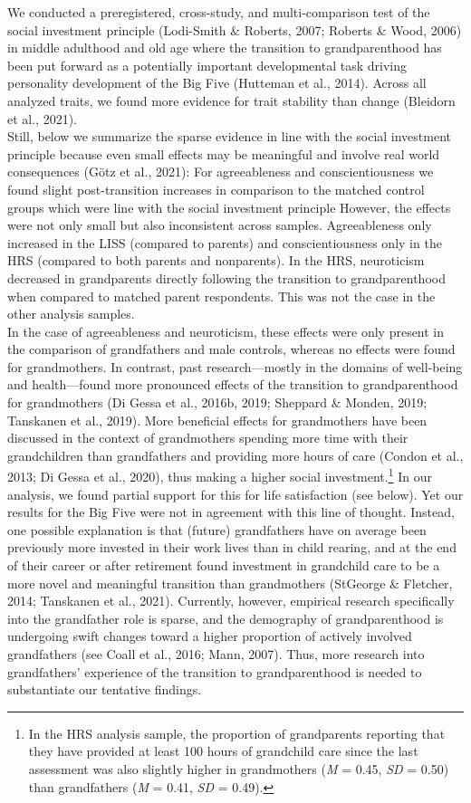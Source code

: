 \documentclass[
  english,
  man, noextraspace]{apa7}
\begin{document}
We conducted a preregistered, cross-study, and multi-comparison test of the social investment principle (Lodi-Smith \& Roberts, 2007; Roberts \& Wood, 2006) in middle adulthood and old age where the transition to grandparenthood has been put forward as a potentially important developmental task driving personality development of the Big Five (Hutteman et al., 2014). Across all analyzed traits, we found more evidence for trait stability than change (Bleidorn et al., 2021).\\
Still, below we summarize the sparse evidence in line with the social investment principle because even small effects may be meaningful and involve real world consequences (Götz et al., 2021): For agreeableness and conscientiousness we found slight post-transition increases in comparison to the matched control groups which were line with the social investment principle However, the effects were not only small but also inconsistent across samples. Agreeableness only increased in the LISS (compared to parents) and conscientiousness only in the HRS (compared to both parents and nonparents). In the HRS, neuroticism decreased in grandparents directly following the transition to grandparenthood when compared to matched parent respondents. This was not the case in the other analysis samples.\\
In the case of agreeableness and neuroticism, these effects were only present in the comparison of grandfathers and male controls, whereas no effects were found for grandmothers. In contrast, past research---mostly in the domains of well-being and health---found more pronounced effects of the transition to grandparenthood for grandmothers (Di Gessa et al., 2016b, 2019; Sheppard \& Monden, 2019; Tanskanen et al., 2019). More beneficial effects for grandmothers have been discussed in the context of grandmothers spending more time with their grandchildren than grandfathers and providing more hours of care (Condon et al., 2013; Di Gessa et al., 2020), thus making a higher social investment.\footnote{In the HRS analysis sample, the proportion of grandparents reporting that they have provided at least 100 hours of grandchild care since the last assessment was also slightly higher in grandmothers (\emph{M} = 0.45, \emph{SD} = 0.50) than grandfathers (\emph{M} = 0.41, \emph{SD} = 0.49).} In our analysis, we found partial support for this for life satisfaction (see below). Yet our results for the Big Five were not in agreement with this line of thought. Instead, one possible explanation is that (future) grandfathers have on average been previously more invested in their work lives than in child rearing, and at the end of their career or after retirement found investment in grandchild care to be a more novel and meaningful transition than grandmothers (StGeorge \& Fletcher, 2014; Tanskanen et al., 2021). Currently, however, empirical research specifically into the grandfather role is sparse, and the demography of grandparenthood is undergoing swift changes toward a higher proportion of actively involved grandfathers (see Coall et al., 2016; Mann, 2007). Thus, more research into grandfathers' experience of the transition to grandparenthood is needed to substantiate our tentative findings.\\
\end{document}
